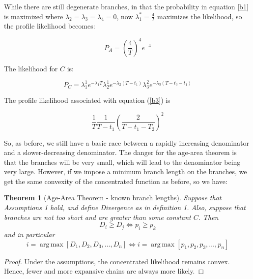 \documentclass[11pt]{article}
\newtheorem{theorem}{Theorem}
\DeclareMathOperator*{\argmax}{arg\,max}
\begin{document}
While there are still degenerate branches, in that the probability in equation \ref{b1} is maximized where $\lambda_2=\lambda_3=\lambda_4=0$, now $\lambda_1^*=\frac{4}{T}$ maximizes the likelihood, so the profile likelihood becomes:

\begin{equation} \label{b2}
P_A=\left(\frac{4}{T}\right)^4e^{-4}
\end{equation}

The likelihood for $C$ is:

\begin{equation} \label{b3}
P_{C}=\lambda_1^1e^{-\lambda_1T}\lambda_2^1e^{-\lambda_2(T-t_1)}
\lambda_3^2e^{-\lambda_3(T-t_0-t_1)}
\end{equation}

The profile likelihood associated with equation (\ref{b3}) is 

\begin{equation} \label{b4}
\frac{1}{T}\frac{1}{T-t_1}\left(\frac{2}{T-t_1-T_2}\right)^2
\end{equation}

So, as before, we still have a basic race between a rapidly increasing denominator and a slower-decreasing denominator. The danger for the age-area theorem is that the branches will be very small, which will lead to the denominator being very large. However, if we impose a minimum branch length on the branches, we get the same convexity of the concentrated function as before, so we have:

\begin{theorem}[Age-Area Theorem  - known branch lengths]
Suppose that Assumptions 1 hold, and define Divergence as in definition 1. Also, suppose that branches are not too short and are greater than some constant $C$. Then  
\begin{equation*}
D_i \geq D_j \Longleftrightarrow p_i\geq p_k
\end{equation*}
and in particular
\begin{equation*}
i=\argmax\left[D_1,D_2,D_3,\hdots,D_n\right] \Longleftrightarrow i=\argmax\left[p_1,p_2,p_3,\hdots,p_n\right]
\end{equation*}
\end{theorem}

\begin{proof}
Under the assumptions, the concentrated likelihood remains convex. Hence, fewer and more expansive chains are always more likely. 
\end{proof}
\end{document}
